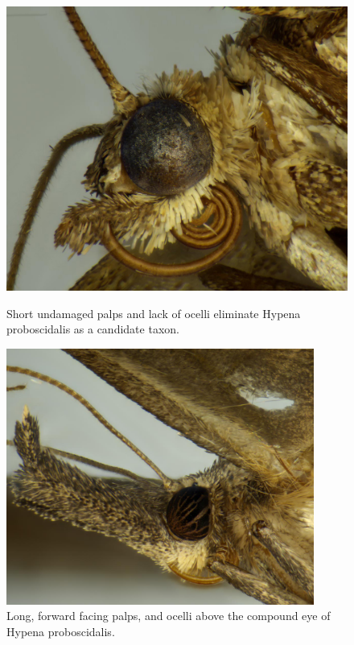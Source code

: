 \documentclass[]{article}
\begin{document}
\begin{figure}
	\centering
	\begin{minipage}{0.45\textwidth}
		\centering
	\includegraphics[width=0.9\linewidth]{202009131026PJP-4}
	\caption{Short undamaged palps and lack of ocelli eliminate Hypena proboscidalis as a candidate taxon.}
	\label{fig:20201112-1}
	\end{minipage}\hfill
	\begin{minipage}{0.45\textwidth}
		\centering
		\includegraphics[width=0.9\textwidth]{S202012271445-4} %
		\caption{Long, forward facing palps, and ocelli above the compound eye of Hypena proboscidalis.}
		\label{fig:S202012271446-4}
	\end{minipage}
\end{figure}
\end{document}
